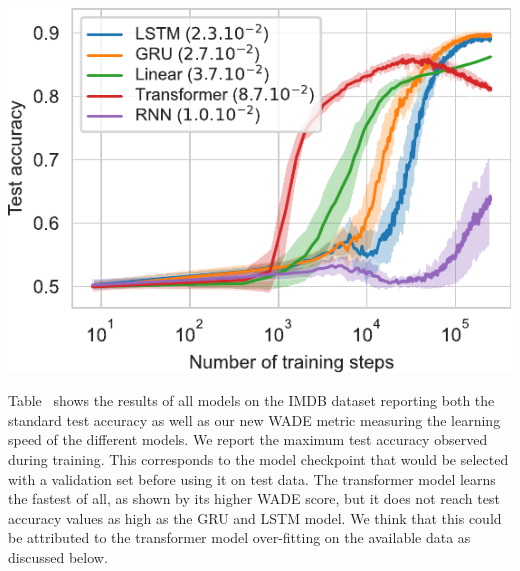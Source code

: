 {\begin{minipage}[htbp]{.66\linewidth}
\begin{tabular}{c|cc}
    \bottomrule
  \end{tabular}
\end{minipage}
\hfill
\begin{minipage}[htbp]{.32\linewidth}
  \vfill
  \centering
  \includegraphics[width=\linewidth]{figures/wade_supervised_fixed.pdf}
  \vspace{-20pt}
  \vfill
\end{minipage}

Table~ shows the results of all models on the IMDB dataset
reporting both the standard test accuracy as well as our new WADE metric
measuring the learning speed of the different models. We report the maximum test
accuracy observed during training. This corresponds to the model checkpoint that
would be selected with a validation set before using it on test data. The
transformer model learns the fastest of all, as shown by its higher WADE score,
but it does not reach test accuracy values as high as the GRU and LSTM model. We
think that this could be attributed to the transformer model over-fitting on the
available data as discussed below.

}
